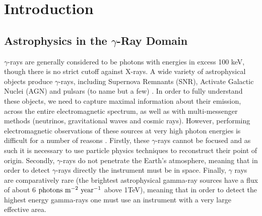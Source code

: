 \chapter{\label{ch:1-intro}Introduction} 
\minitoc
\section{Astrophysics in the \ensuremath{\gamma}-Ray Domain}
$\gamma$-rays are generally considered to be photons with energies in excess 100 keV, though there is no strict cutoff against X-rays. A wide variety of astrophysical objects produce $\gamma$-rays, including Supernova Remnants (SNR), Activate Galactic Nuclei (AGN) and pulsars (to name but a few) \cite{scienceCTA}. In order to fully understand these objects, we need to capture maximal information about their emission, across the entire electromagnetic spectrum, as well as with multi-messenger methods (neutrinos, gravitational waves and cosmic rays).  However, performing electromagnetic observations of these sources at very high photon energies is difficult for a number of reasons \cite{jamieiact}. Firstly, these $\gamma$-rays cannot be focused and as such it is necessary to use particle physics techniques to reconstruct their point of origin. Secondly, $\gamma$-rays do not penetrate the Earth's atmosphere, meaning that in order to detect $\gamma$-rays directly the instrument must be in space. Finally, $\gamma$ rays are comparatively rare (the brightest astrophysical gamma-ray sources have a flux of about 6 $\rm{photons} \ \rm{m}^{-2}\ \rm{year}^{-1}$ above 1TeV\cite{jamieiact}), meaning that in order to detect the highest energy gamma-rays one must use an instrument with a very large effective area.

